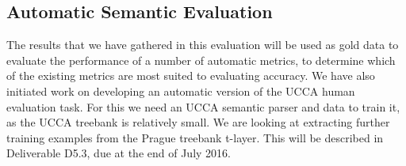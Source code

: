 \documentclass[11pt]{article}
\begin{document}
%
%


\subsection{Automatic Semantic Evaluation}

The results that we have gathered in this evaluation will be used as gold data to evaluate the performance of a number of automatic
metrics, to determine which of the existing metrics are most suited to evaluating accuracy.  We have also  initiated
work on developing an automatic version of the UCCA human evaluation task. For this we need an UCCA semantic parser
and data to train it, as the UCCA treebank is relatively small. We are looking at extracting further training examples from
the Prague treebank t-layer. This will be described in Deliverable D5.3, due at the end of July 2016. 
\end{document}
